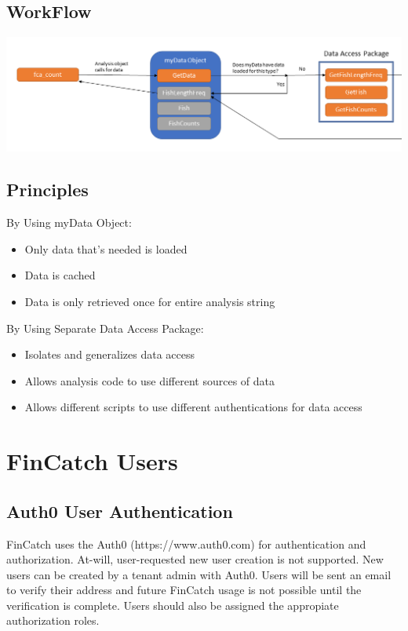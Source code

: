 \documentclass[
  letterpaper,
  DIV=11,
  numbers=noendperiod]{scrreprt}
\begin{document}
\section{WorkFlow}\label{workflow}

\includegraphics{ArchVis/Slide2.PNG}

\section{Principles}\label{principles}

By Using myData Object:

\begin{itemize}
\item
  Only data that's needed is loaded
\item
  Data is cached
\item
  Data is only retrieved once for entire analysis string
\end{itemize}

By Using Separate Data Access Package:

\begin{itemize}
\item
  Isolates and generalizes data access
\item
  Allows analysis code to use different sources of data
\item
  Allows different scripts to use different authentications for data
  access
\end{itemize}

\chapter{FinCatch Users}\label{fincatch-users}

\section{Auth0 User Authentication}\label{auth0-user-authentication}

FinCatch uses the Auth0 (https://www.auth0.com) for authentication and
authorization. At-will, user-requested new user creation is not
supported. New users can be created by a tenant admin with Auth0. Users
will be sent an email to verify their address and future FinCatch usage
is not possible until the verification is complete. Users should also be
assigned the appropiate authorization roles.
\end{document}
